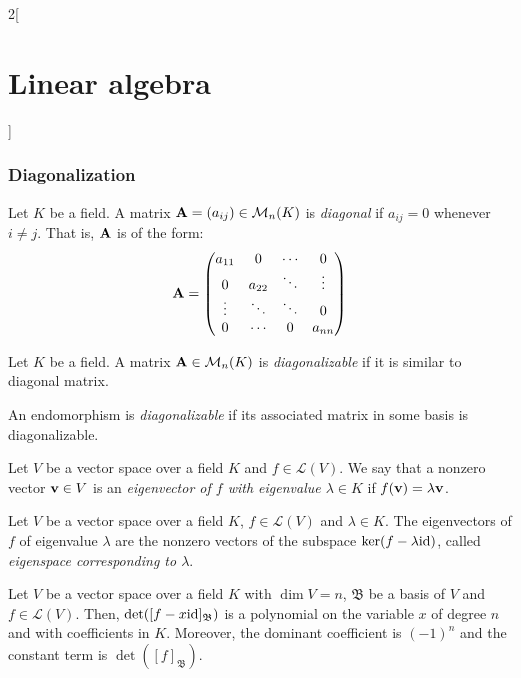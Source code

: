 \documentclass[../../../main.tex]{subfiles}
\begin{document}
\begin{multicols}{2}[\section{Linear algebra}]
  \subsubsection*{Diagonalization}
  \begin{definition}
    Let $K$ be a field. A matrix $\vb{A}=(a_{ij})\in\mathcal{M}_n(K)$ is \textit{diagonal} if $a_{ij}=0$ whenever $i\ne j$. That is, $\vb{A}$ is of the form:
    $$\vb{A}=
      \begin{pmatrix}
        a_{11} & 0      & \cdots & 0      \\
        0      & a_{22} & \ddots & \vdots \\
        \vdots & \ddots & \ddots & 0      \\
        0      & \cdots & 0      & a_{nn}
      \end{pmatrix}
    $$
  \end{definition}
  \begin{definition}
    Let $K$ be a field. A matrix $\vb{A}\in\mathcal{M}_n(K)$ is \textit{diagonalizable} if it is similar to diagonal matrix.
  \end{definition}
  \begin{definition}
    An endomorphism is \textit{diagonalizable} if its associated matrix in some basis is diagonalizable.
  \end{definition}
  \begin{definition}
    Let $V$ be a vector space over a field $K$ and $f\in\mathcal{L}(V)$. We say that a nonzero vector $\vb{v}\in V$ is an \textit{eigenvector of $f$ with eigenvalue $\lambda\in K$} if $f(\vb{v})=\lambda \vb{v}$.
  \end{definition}
  \begin{lemma}
    Let $V$ be a vector space over a field $K$, $f\in\mathcal{L}(V)$ and $\lambda\in K$. The eigenvectors of $f$ of eigenvalue $\lambda$ are the nonzero vectors of the subspace $\ker(f-\lambda\mathrm{id})$, called \textit{eigenspace corresponding to $\lambda$}.
  \end{lemma}
  \begin{lemma}
    Let $V$ be a vector space over a field $K$ with $\dim V=n$, $\mathfrak{B}$ be a basis of $V$ and $f\in\mathcal{L}(V)$. Then, $\det([f-x\mathrm{id}]_\mathfrak{B})$ is a polynomial on the variable $x$ of degree $n$ and with coefficients in $K$. Moreover, the dominant coefficient is $(-1)^n$ and the constant term is $\det([f]_\mathfrak{B})$.
  \end{lemma}
  \begin{corollary}

\end{corollary}
\end{multicols}
\end{document}
